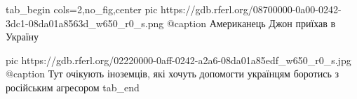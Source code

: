  
 
 
 
 


\ifcmt
  tab_begin cols=2,no_fig,center
     pic https://gdb.rferl.org/08700000-0a00-0242-3dc1-08da01a8563d_w650_r0_s.png
		 @caption Американець Джон приїхав в Україну

		 pic https://gdb.rferl.org/02220000-0aff-0242-a2a6-08da01a85edf_w650_r0_s.jpg
		 @caption Тут очікують іноземців, які хочуть допомогти українцям боротись з російським агресором
  tab_end
\fi
